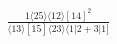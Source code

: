 \documentclass[varwidth, border=5pt]{standalone}
\begin{document}
\begin{my}
$\begin{gathered}
\scriptscriptstyle\frac{1⟨25⟩⟨12⟩[14]^2}{⟨13⟩[15]⟨23⟩⟨1|2+3|1]}
\end{gathered}$
\end{my}
\end{document}
